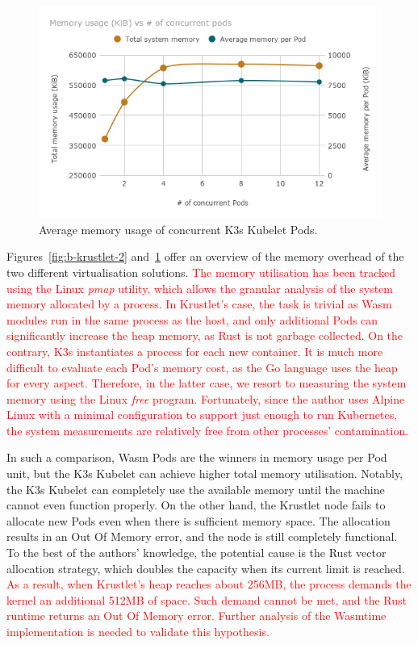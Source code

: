 \begin{figure}[ht]
\centering
\includegraphics[width=\columnwidth]{figures/b-krustlet-3}
\caption{Average memory usage of concurrent K3s Kubelet Pods.}
\label{fig:b-krustlet-3}
\end{figure}

Figures~\ref{fig:b-krustlet-2} and~\ref{fig:b-krustlet-3} offer an overview of the memory overhead of the two different virtualisation solutions. \textcolor{red}{The memory utilisation has been tracked using the Linux \emph{pmap} utility, which allows the granular analysis of the system memory allocated by a process. In Krustlet's case, the task is trivial as Wasm modules run in the same process as the host, and only additional Pods can significantly increase the heap memory, as Rust is not garbage collected. On the contrary, K3s instantiates a process for each new container. It is much more difficult to evaluate each Pod's memory cost, as the Go language uses the heap for every aspect. Therefore, in the latter case, we resort to measuring the system memory using the Linux \emph{free} program. Fortunately, since the author uses Alpine Linux with a minimal configuration to support just enough to run Kubernetes, the system measurements are relatively free from other processes' contamination.}

In such a comparison, Wasm Pods are the winners in memory usage per Pod unit, but the K3s Kubelet can achieve higher total memory utilisation. Notably, the K3s Kubelet can completely use the available memory until the machine cannot even function properly. On the other hand, the Krustlet node fails to allocate new Pods even when there is sufficient memory space. The allocation results in an Out Of Memory error, and the node is still completely functional. To the best of the authors' knowledge, the potential cause is the Rust vector allocation strategy, which doubles the capacity when its current limit is reached. \textcolor{red}{As a result, when Krustlet's heap reaches about 256MB, the process demands the kernel an additional 512MB of space. Such demand cannot be met, and the Rust runtime returns an Out Of Memory error. Further analysis of the Wasmtime implementation is needed to validate this hypothesis.}

